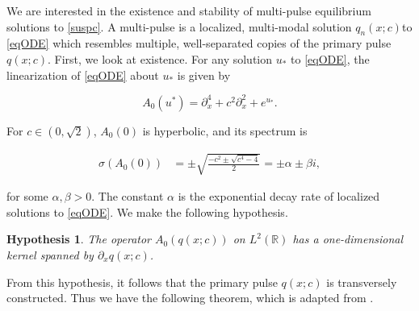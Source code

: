 \documentclass[12pt]{article}
\def\R{{\mathbb R}}
\newtheorem{hypothesis}{Hypothesis}
\begin{document}
We are interested in the existence and stability of multi-pulse equilibrium solutions to \eqref{suspc}. A multi-pulse is a localized, multi-modal solution $q_n(x; c) $to \eqref{eqODE} which resembles multiple, well-separated copies of the primary pulse $q(x; c)$. First, we look at existence. For any solution $u_*$ to \eqref{eqODE}, the linearization of \eqref{eqODE} about $u_*$ is given by

\begin{equation}\label{defA0}
A_0(u^*) = \partial_x^4 + c^2 \partial_x^2 + e^{u_*}.
\end{equation}

For $c \in (0, \sqrt{2})$, $A_0(0)$ is hyperbolic, and its spectrum is

\begin{align}\label{specA00}
\sigma(A_0(0)) &= \pm \sqrt{\frac{-c^2 \pm \sqrt{c^4 - 4}}{2} } = \pm \alpha \pm \beta i,
\end{align}

for some $\alpha, \beta > 0$. The constant $\alpha$ is the exponential decay rate of localized solutions to \eqref{eqODE}. We make the following hypothesis.

\begin{hypothesis}\label{A0kernel}
The operator $A_0(q(x; c))$ on $L^2(\R)$ has a one-dimensional kernel spanned by $\partial_x q(x; c)$.
\end{hypothesis}

From this hypothesis, it follows that the primary pulse $q(x; c)$ is transversely constructed. Thus we have the following theorem, which is adapted from \cite[Theorem 3.6]{Sandstede1997}.
\end{document}

